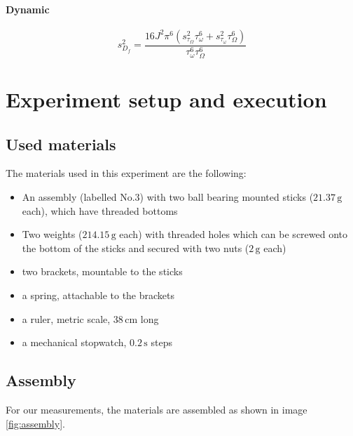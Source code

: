 \documentclass{scrreprt}
\newcommand{\unit}[1]{\ensuremath{\, \mathrm{#1}}}
\begin{document}
\paragraph*{Dynamic}
\begin{equation}
s_{D_f}^2 = \frac{16 J^2 \pi^6 \left( s_{\tau_{\Omega}}^2 \tau_{\omega}^6 + s_{\tau_{\omega}}^2 \tau_{\Omega}^6 \right)}{\tau_{\omega}^6 \tau_{\Omega}^6}
\end{equation}

\section{Experiment setup and execution}

\subsection{Used materials}
The materials used in this experiment are the following:
\begin{itemize}
\item An assembly (labelled No.$3$) with two ball bearing mounted sticks ($21.37\unit{g}$ each), which have threaded bottoms
\item Two weights ($214.15 \unit{g}$ each) with threaded holes which can be screwed onto the bottom of the sticks and secured with two nuts ($2\unit{g}$ each)
\item two brackets, mountable to the sticks
\item a spring, attachable to the brackets 
\item a ruler, metric scale, $38 \unit{cm}$ long
\item a mechanical stopwatch, $0.2 \unit{s}$ steps
\end{itemize}

\subsection{Assembly}
For our measurements, the materials are assembled as shown in image \ref{fig:assembly}.
\end{document}
